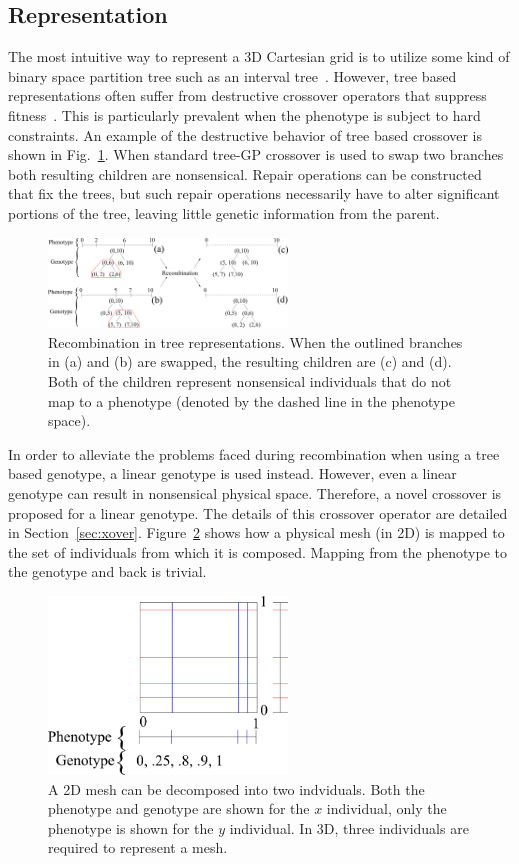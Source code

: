 \documentclass[conference]{IEEEtran}
\begin{document}
\subsection{Representation}\label{sec:methodology.representation}
The most intuitive way to represent a 3D Cartesian grid is to utilize some kind of binary space partition tree such as an interval tree~\cite{ref:Franco1985}. However, tree based representations often suffer from destructive crossover operators that suppress fitness~\cite{ref:Sheneman2006}. This is particularly prevalent when the phenotype is subject to hard constraints. An example of the destructive behavior of tree based crossover is shown in Fig.~\ref{fig:treefail}. When standard tree-GP crossover is used to swap two branches both resulting children are nonsensical. Repair operations can be constructed that fix the trees, but such repair operations necessarily have to alter significant portions of the tree, leaving little genetic information from the parent.
\begin{figure}[!t]
\centering
\includegraphics[width=2.5in]{treefail}
\caption{Recombination in tree representations. When the outlined branches in (a) and (b) are swapped, the resulting children are (c) and (d). Both of the children represent nonsensical individuals that do not map to a phenotype (denoted by the dashed line in the phenotype space).}
\label{fig:treefail}
\end{figure}

In order to alleviate the problems faced during recombination when using a tree based genotype, a linear genotype is used instead. However, even a linear genotype can result in nonsensical physical space. Therefore, a novel crossover is proposed for a linear genotype. The details of this crossover operator are detailed in Section~\ref{sec:xover}. Figure~\ref{fig:reprmap} shows how a physical mesh (in 2D) is mapped to the set of individuals from which it is composed. Mapping from the phenotype to the genotype and back is trivial.
\begin{figure}[!t]
\centering
\includegraphics[width=2.5in]{reprmap}
\caption{A 2D mesh can be decomposed into two indviduals. Both the phenotype and genotype are shown for the $x$ individual, only the phenotype is shown for the $y$ individual. In 3D, three individuals are required to represent a mesh.}
\label{fig:reprmap}
\end{figure}
\end{document}
